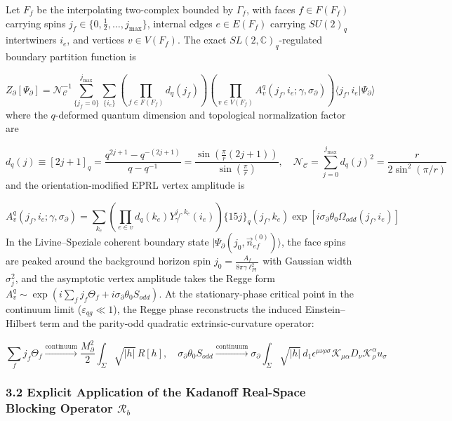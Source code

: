 \documentclass[aps,prd,onecolumn,superscriptaddress,nofootinbib,longbibliography,10pt]{revtex4-2}
\begin{document}
{{  Let \(F_f\) be the interpolating two-complex bounded by \(\Gamma_f\), with faces \(f \in F(F_f)\) carrying spins \(j_f \in \{0, \frac{1}{2}, \dots, j_{\max}\}\), internal edges \(e \in E(F_f)\) carrying \(SU(2)_q\) intertwiners \(i_e\), and vertices \(v \in V(F_f)\). The exact \(SL(2,\mathbb{C})_q\)-regulated boundary partition function is


  \[ Z_\partial[\Psi_\partial] = \mathcal{N}_{\mathcal{C}}^{-1} \sum_{\{j_f=0\}}^{j_{\max}} \sum_{\{i_e\}} \left( \prod_{f\in F(F_f)} d_q(j_f) \right)\left( \prod_{v\in V(F_f)} A_v^q(j_f, i_e; \gamma, \sigma_\partial) \right)\langle j_f, i_e | \Psi_\partial\rangle \]
  where the \(q\)-deformed quantum dimension and topological normalization factor are


  \[ d_q(j) \equiv [2j+1]_q = \frac{q^{2j+1} - q^{-(2j+1)}}{q - q^{-1}} = \frac{\sin\left(\frac{\pi}{r}(2j+1)\right)}{\sin\left(\frac{\pi}{r}\right)}, \quad \mathcal{N}_{\mathcal{C}} = \sum_{j=0}^{j_{\max}} d_q(j)^2 = \frac{r}{2\sin^2(\pi/r)} \]
  and the orientation-modified EPRL vertex amplitude is


  \[ A_v^q(j_f, i_e; \gamma, \sigma_\partial) = \sum_{k_e}\left(\prod_{e\in v} d_q(k_e) Y_\gamma^{j_f, k_e}(i_e)\right)\{15j\}_q(j_f, k_e)\exp\left[i\sigma_\partial\theta_0\Omega_{odd}(j_f, i_e)\right] \]
  In the Livine–Speziale coherent boundary state \(|\Psi_\partial(j_0, \vec{n}_{ef}^{(0)})\rangle\), the face spins are peaked around the background horizon spin \(j_0 = \frac{A_f}{8\pi\gamma\ell_{Pl}^2}\) with Gaussian width \(\sigma_j^2\), and the asymptotic vertex amplitude takes the Regge form \(A_v^q \sim \exp\left(i\sum_f j_f\Theta_f + i\sigma_\partial\theta_0 S_{odd}\right)\). At the stationary-phase critical point in the continuum limit (\(\varepsilon_{qg} \ll 1\)), the Regge phase reconstructs the induced Einstein–Hilbert term and the parity-odd quadratic extrinsic-curvature operator:


  \[ \sum_f j_f\Theta_f \xrightarrow{\text{continuum}} \frac{M_\partial^2}{2}\int_\Sigma \sqrt{|h|}\,R[h], \quad \sigma_\partial\theta_0 S_{odd} \xrightarrow{\text{continuum}} \sigma_\partial\int_\Sigma \sqrt{|h|}\,d_1\epsilon^{\mu\nu\rho\sigma}\mathcal{K}_{\mu\alpha}D_\nu\mathcal{K}^\alpha_\rho u_\sigma \]
  
  
\subsubsection*{3.2 Explicit Application of the Kadanoff Real-Space Blocking Operator \(\mathcal{R}_b\)}

}}
\end{document}
